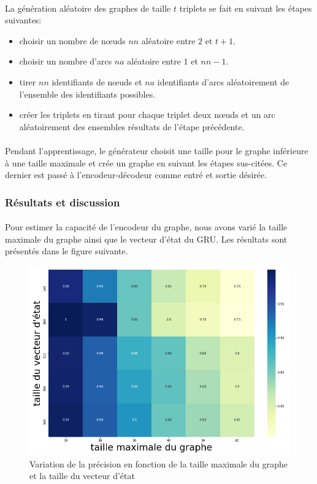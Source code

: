 \paragraph{}La génération aléatoire des graphes de taille $t$ triplets se fait en suivant les étapes suivantes:
\begin{itemize}
	\item choisir un nombre de n\oe{}uds $nn$ aléatoire entre $2$ et $t+1$.
	\item choisir un nombre d'arcs $na$ aléatoire entre $1$ et $nn-1$.
	\item tirer $nn$ identifiants de n\oe{}uds et $na$ identifiants d'arcs aléatoirement de l'ensemble des identifiants possibles.
	\item créer les triplets en tirant pour chaque triplet deux n\oe{}uds et un arc aléatoirement des ensembles résultats de l'étape précédente. 
\end{itemize}
\paragraph{}Pendant l'apprentissage, le générateur choisit une taille pour le graphe inférieure à une taille maximale et crée un graphe en suivant les étapes sus-citées. Ce dernier est passé à l'encodeur-décodeur comme entré et sortie désirée.
\subsubsection{Résultats et discussion}
\paragraph{}Pour estimer la capacité de l'encodeur du graphe, nous avons varié la taille maximale du graphe ainsi que le vecteur d'état du GRU. Les résultats sont présentés dans le figure suivante.
\begin{figure}[H] 
	\centering
	\includegraphics[width=0.95\linewidth]{images/Realisation/DM/heatmap.png}
	\caption{Variation de la précision en fonction de la taille maximale du graphe et la taille du vecteur d'état}\label{heatmap}
\end{figure}
